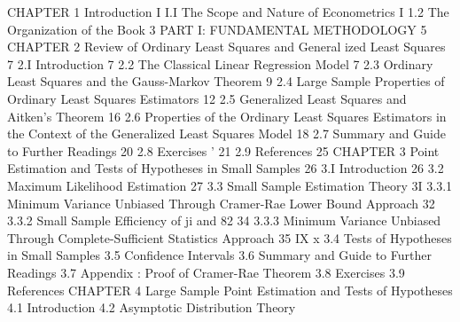 CHAPTER 1
Introduction I
I.I The Scope and Nature of Econometrics I
1.2 The Organization of the Book 3
PART I: FUNDAMENTAL METHODOLOGY 5
CHAPTER 2
Review of Ordinary Least Squares and General ized Least Squares 7
2.I Introduction 7
2.2 The Classical Linear Regression Model 7
2.3 Ordinary Least Squares and the Gauss-Markov Theorem 9
2.4 Large Sample Properties of Ordinary Least Squares Estimators 12
2.5 Generalized Least Squares and Aitken's Theorem 16
2.6 Properties of the Ordinary Least Squares Estimators in the Context
of the Generalized Least Squares Model 18
2.7 Summary and Guide to Further Readings 20
2.8 Exercises ' 21
2.9 References 25
CHAPTER 3
Point Estimation and Tests of Hypotheses in Small Samples 26
3.I Introduction 26
3.2 Maximum Likelihood Estimation 27
3.3 Small Sample Estimation Theory 3I
3.3.1 Minimum Variance Unbiased Through Cramer-Rae
Lower Bound Approach 32
3.3.2 Small Sample Efficiency of ji and 82 34
3.3.3 Minimum Variance Unbiased Through Complete-Sufficient
Statistics Approach 35
IX
x
3.4 Tests of Hypotheses in Small Samples
3.5 Confidence Intervals
3.6 Summary and Guide to Further Readings
3.7 Appendix : Proof of Cramer-Rae Theorem
3.8 Exercises
3.9 References
CHAPTER 4
Large Sample Point Estimation and Tests of Hypotheses
4.1 Introduction
4.2 Asymptotic Distribution Theory
